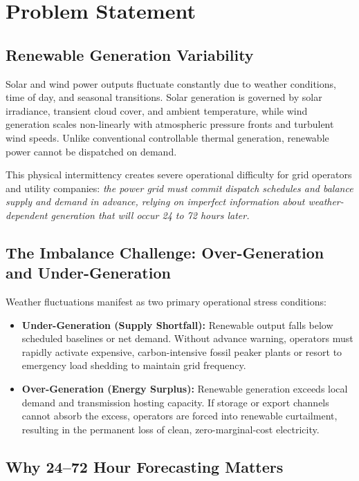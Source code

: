\section{Problem Statement}
\label{sec:problem_statement}

\subsection{Renewable Generation Variability}
\label{subsec:variability}

Solar and wind power outputs fluctuate constantly due to weather conditions, time of day, and seasonal transitions. Solar generation is governed by solar irradiance, transient cloud cover, and ambient temperature, while wind generation scales non-linearly with atmospheric pressure fronts and turbulent wind speeds. Unlike conventional controllable thermal generation, renewable power cannot be dispatched on demand.

This physical intermittency creates severe operational difficulty for grid operators and utility companies: \emph{the power grid must commit dispatch schedules and balance supply and demand in advance, relying on imperfect information about weather-dependent generation that will occur 24 to 72 hours later.}

\subsection{The Imbalance Challenge: Over-Generation and Under-Generation}
\label{subsec:imbalance_challenge}

Weather fluctuations manifest as two primary operational stress conditions:
\begin{itemize}[leftmargin=1.5em, itemsep=0.25em]
    \item \textbf{Under-Generation (Supply Shortfall):} Renewable output falls below scheduled baselines or net demand. Without advance warning, operators must rapidly activate expensive, carbon-intensive fossil peaker plants or resort to emergency load shedding to maintain grid frequency.
    \item \textbf{Over-Generation (Energy Surplus):} Renewable generation exceeds local demand and transmission hosting capacity. If storage or export channels cannot absorb the excess, operators are forced into renewable curtailment, resulting in the permanent loss of clean, zero-marginal-cost electricity.
\end{itemize}

\subsection{Why 24--72 Hour Forecasting Matters}
\label{subsec:why_forecasting}

